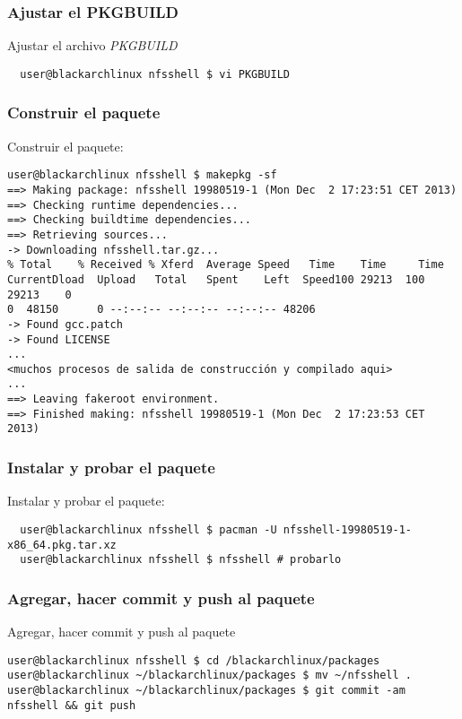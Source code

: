 \documentclass[a4paper, oneside, 11pt]{book}
\begin{document}
\subsubsection{Ajustar el PKGBUILD}
Ajustar el archivo \textit{PKGBUILD}
\begin{lstlisting}
  user@blackarchlinux nfsshell $ vi PKGBUILD
\end{lstlisting}

\subsubsection{Construir el paquete}
Construir el paquete:
\begin{lstlisting}
user@blackarchlinux nfsshell $ makepkg -sf
==> Making package: nfsshell 19980519-1 (Mon Dec  2 17:23:51 CET 2013)
==> Checking runtime dependencies...
==> Checking buildtime dependencies...
==> Retrieving sources...
-> Downloading nfsshell.tar.gz...
% Total    % Received % Xferd  Average Speed   Time    Time     Time
CurrentDload  Upload   Total   Spent    Left  Speed100 29213  100 29213    0
0  48150      0 --:--:-- --:--:-- --:--:-- 48206
-> Found gcc.patch
-> Found LICENSE
...
<muchos procesos de salida de construcción y compilado aqui>
...
==> Leaving fakeroot environment.
==> Finished making: nfsshell 19980519-1 (Mon Dec  2 17:23:53 CET 2013)
\end{lstlisting}

\subsubsection{Instalar y probar el paquete}
Instalar y probar el paquete:
\begin{lstlisting}
  user@blackarchlinux nfsshell $ pacman -U nfsshell-19980519-1-x86_64.pkg.tar.xz
  user@blackarchlinux nfsshell $ nfsshell # probarlo
\end{lstlisting}

\subsubsection{Agregar, hacer commit y push al paquete}
Agregar, hacer commit y push al paquete
\begin{lstlisting}
user@blackarchlinux nfsshell $ cd /blackarchlinux/packages
user@blackarchlinux ~/blackarchlinux/packages $ mv ~/nfsshell .
user@blackarchlinux ~/blackarchlinux/packages $ git commit -am nfsshell && git push
\end{lstlisting}
\end{document}
